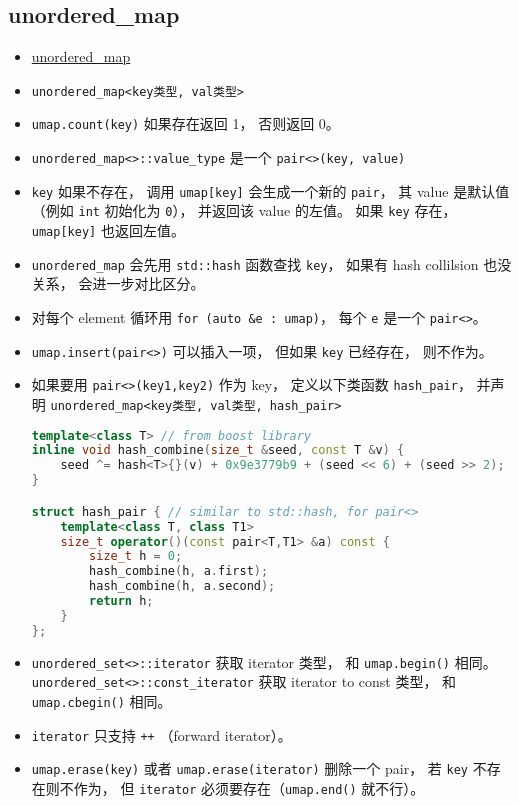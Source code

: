 \subsection{unordered\_map}
\begin{itemize}
\item \href{https://cplusplus.com/reference/unordered_map/unordered_map/}{unordered\_map}
\item \verb|unordered_map<key类型, val类型>|
\item \verb|umap.count(key)| 如果存在返回 1， 否则返回 0。
\item \verb|unordered_map<>::value_type| 是一个 \verb|pair<>(key, value)|
\item \verb|key| 如果不存在， 调用 \verb|umap[key]| 会生成一个新的 \verb|pair|， 其 value 是默认值 （例如 \verb|int| 初始化为 \verb|0|）， 并返回该 value 的左值。 如果 \verb|key| 存在， \verb|umap[key]| 也返回左值。
\item \verb|unordered_map| 会先用 \verb|std::hash| 函数查找 \verb|key|， 如果有 hash collilsion 也没关系， 会进一步对比区分。
\item 对每个 element 循环用 \verb|for (auto &e : umap)|， 每个 \verb|e| 是一个 \verb|pair<>|。
\item \verb|umap.insert(pair<>)| 可以插入一项， 但如果 \verb|key| 已经存在， 则不作为。
\item 如果要用 \verb|pair<>(key1,key2)| 作为 key， 定义以下类函数 \verb|hash_pair|， 并声明 \verb|unordered_map<key类型, val类型, hash_pair>|
\begin{lstlisting}[language=cpp]
template<class T> // from boost library
inline void hash_combine(size_t &seed, const T &v) {
    seed ^= hash<T>{}(v) + 0x9e3779b9 + (seed << 6) + (seed >> 2);
}

struct hash_pair { // similar to std::hash, for pair<>
    template<class T, class T1>
    size_t operator()(const pair<T,T1> &a) const {
        size_t h = 0;
        hash_combine(h, a.first);
        hash_combine(h, a.second);
        return h;
    }
};
\end{lstlisting}
\item \verb|unordered_set<>::iterator| 获取 iterator 类型， 和 \verb|umap.begin()| 相同。 \verb|unordered_set<>::const_iterator| 获取 iterator to const 类型， 和 \verb|umap.cbegin()| 相同。
\item \verb|iterator| 只支持 \verb|++| （forward iterator）。
\item \verb|umap.erase(key)| 或者 \verb|umap.erase(iterator)| 删除一个 pair， 若 \verb|key| 不存在则不作为， 但 \verb|iterator| 必须要存在（\verb|umap.end()| 就不行）。
\end{itemize}

